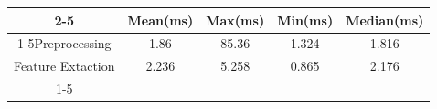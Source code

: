\documentclass{standalone}
\begin{document}
 
 \begin{tabular}{|c |c |c |c |c |}
\cline{2-5}\cline{2-5} \multicolumn{1}{c |}{ } & Mean(ms) & Max(ms) & Min(ms) & Median(ms)\\ 
\cline{1-5}Preprocessing & 1.86 & 85.36 & 1.324 & 1.816\\ 
 \hhline{|=|=|=|=|=|}Feature Extaction & 2.236 & 5.258 & 0.865 & 2.176\\ 
 \cline{1-5}\hline \end{tabular}
 
\end{document}
